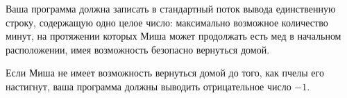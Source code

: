 Ваша программа должна записать в стандартный поток вывода единственную строку, содержащую
одно целое число: максимально возможное количество минут, на протяжении которых Миша
может продолжать есть мед в начальном расположении, имея возможность безопасно вернуться
домой.

Если Миша не имеет возможность вернуться домой до того, как пчелы его настигнут, ваша
программа должны выводить отрицательное число $-1$.

